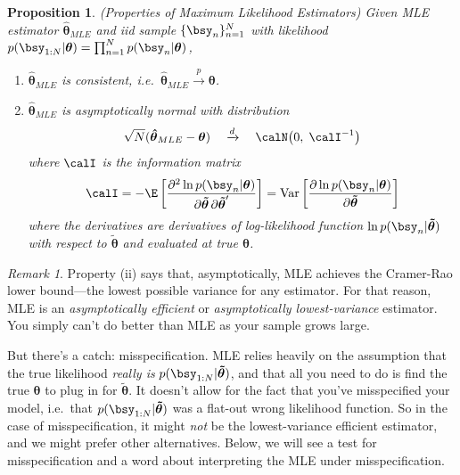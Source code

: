 \documentclass[12pt]{article}
\theoremstyle{plain}
\newtheorem{prop}[thm]{Proposition}
\theoremstyle{definition}
\theoremstyle{remark}
\newtheorem*{rmk}{Remark}
\newcommand{\bstheta}{\boldsymbol{\theta}}
\newcommand{\bshattheta}{\boldsymbol{\hat{\theta}}}
\newcommand{\bstildetheta}{\boldsymbol{\tilde{\theta}}}
\newcommand{\Var}{\operatorname{Var}}
\newcommand{\pto}{\xrightarrow{p}}
\newcommand{\dto}{\xrightarrow{d}}
\newcommand{\prodnN}{\prod^N_{n=1}}
\newcommand{\nN}{_{n=1}^N}
\begin{document}
\begin{prop}\emph{(Properties of Maximum Likelihood Estimators)}
Given MLE estimator $\bshattheta_{MLE}$ and iid sample $\{\bsy_n\}\nN$
with likelihood $p(\bsy_{1:N}|\bstheta) =\prodnN p(\bsy_n|\bstheta)$,
\begin{enumerate}[label=\emph{(\roman*)}]
  \item $\bshattheta_{MLE}$ is consistent, i.e.\
    $\bshattheta_{MLE}\pto\bstheta$.
  \item $\bshattheta_{MLE}$ is asymptotically normal with distribution
    \begin{align*}
      \sqrt{N}(\bshattheta_{MLE}-\bstheta)
      \quad\dto\quad
      \calN\big(0,\;
      \calI^{-1}
      \big)
    \end{align*}
    where $\calI$ is the information matrix
    \begin{align*}
      \calI
      = -\E\left[
        \frac{\partial^2 \ln p(\bsy_n|\bstheta)}{%
          \partial \bstildetheta \,\partial \bstildetheta'}
        \right]
      = \Var\left[
        \frac{\partial \ln p(\bsy_n|\bstheta)}{%
          \partial \bstildetheta}
        \right]
    \end{align*}
    where the derivatives are derivatives of log-likelihood function
    $\ln p(\bsy_n|\bstildetheta)$ with respect to $\bstildetheta$ and
    evaluated at true $\bstheta$.
\end{enumerate}
\end{prop}
\begin{rmk}
Property (ii) says that, asymptotically, MLE achieves the Cramer-Rao
lower bound---the lowest possible variance for any estimator. For that
reason, MLE is an \emph{asymptotically efficient} or
\emph{asymptotically lowest-variance} estimator. You simply can't do
better than MLE as your sample grows large.

But there's a catch: misspecification.
MLE relies heavily on the assumption that the true likelihood
\emph{really is} $p(\bsy_{1:N}|\bstildetheta)$, and that all you need to
do is find the true $\bstheta$ to plug in for $\bstildetheta$. It
doesn't allow for the fact that you've misspecified your model, i.e.\
that $p(\bsy_{1:N}|\bstildetheta)$ was a flat-out wrong likelihood
function. So in the case of misspecification, it might \emph{not} be the
lowest-variance efficient estimator, and we might prefer other
alternatives. Below, we will see a test for misspecification and a word
about interpreting the MLE under misspecification.
\end{rmk}
\end{document}
